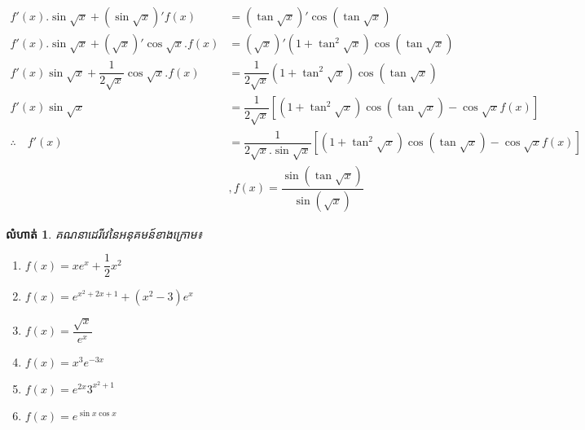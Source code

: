 \documentclass[a4paper,12pt]{article}
\newcommand{\kml}{\fontspec[Scale = 0.8333333334, Script=Khmer]{Khmer OS Muol Light}\selectfont}
\newtheorem{exercise}{\kml លំហាត់}
\begin{document}
\begin{enumerate}
\begin{align*}
f'(x).\sin \sqrt{x}+(\sin \sqrt{x})'f(x)&=(\tan \sqrt{x})'\cos (\tan \sqrt{x})\\
f'(x).\sin \sqrt{x} +(\sqrt{x})'\cos \sqrt{x}.f(x)&=(\sqrt{x})'(1+\tan^2 \sqrt{x})\cos (\tan \sqrt{x})\\
f'(x)\sin \sqrt{x}+\dfrac{1}{2\sqrt{x}}\cos \sqrt{x}.f(x)&=\dfrac{1}{2\sqrt{x}}(1+\tan^2 \sqrt{x})\cos (\tan \sqrt{x}) \\
f'(x)\sin \sqrt{x} &=\dfrac{1}{2\sqrt{x}}\left[(1+\tan^2 \sqrt{x})\cos (\tan \sqrt{x})-\cos \sqrt{x}f(x)  \right]\\
\therefore \quad f'(x)&=\dfrac{1}{2\sqrt{x}.\sin \sqrt{x}}\left[(1+\tan^2 \sqrt{x})\cos (\tan \sqrt{x})-\cos \sqrt{x}f(x)  \right]\\
&,f(x)=\dfrac{\sin (\tan \sqrt{x})}{\sin (\sqrt{x})}
\end{align*}
\end{enumerate}
\begin{exercise}
គណនាដេរីវេនៃអនុគមន៍ខាងក្រោម៖
\begin{multicols}{2}
\begin{enumerate}
\item $f(x)=xe^x +\dfrac{1}{2}x^2$
\item $f(x)=e^{x^2+2x+1}+(x^2-3)e^x$
\item $f(x)=\dfrac{\sqrt{x}}{e^x}$
\item $f(x)=x^3 e^{-3x}$
\item $f(x)=e^{2x}3^{x^2+1}$
\item $f(x)=e^{\sin x\cos x}$
\end{enumerate}
\end{multicols}
\end{exercise}
\end{document}
